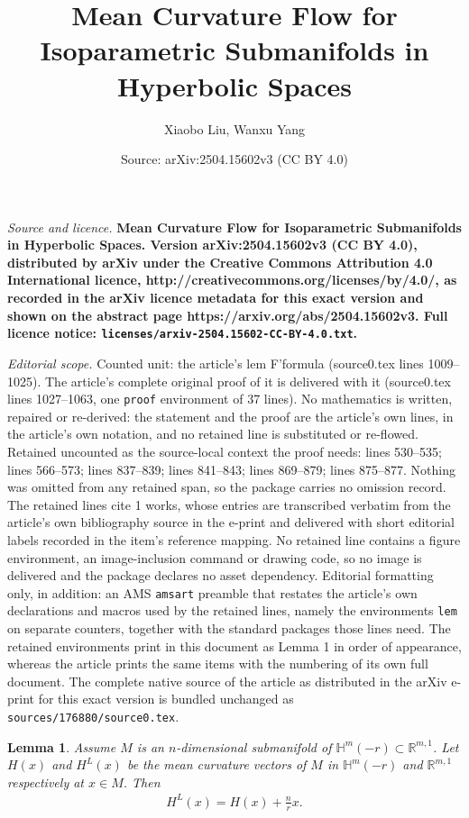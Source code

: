 \documentclass[10pt,a4paper]{amsart}
\title{\bf Mean Curvature Flow for Isoparametric Submanifolds in Hyperbolic Spaces}
\author{Xiaobo Liu, Wanxu Yang}
\date{Source: arXiv:2504.15602v3 (CC BY 4.0)}
\newtheorem{lem}{Lemma}
\begin{document}
\maketitle

\noindent\emph{Source and licence.} \bf Mean Curvature Flow for Isoparametric Submanifolds in Hyperbolic Spaces. Version arXiv:2504.15602v3 (CC BY 4.0), distributed by arXiv under the Creative Commons Attribution 4.0 International licence, http://creativecommons.org/licenses/by/4.0/, as recorded in the arXiv licence metadata for this exact version and shown on the abstract page https://arxiv.org/abs/2504.15602v3. Full licence notice: \texttt{licenses/arxiv-2504.15602-CC-BY-4.0.txt}.\par\smallskip

\noindent\textit{Editorial scope.} Counted unit: the article's lem F'formula (source0.tex lines 1009--1025). The article's complete original proof of it is delivered with it (source0.tex lines 1027--1063, one \texttt{proof} environment of 37 lines). No mathematics is written, repaired or re-derived: the statement and the proof are the article's own lines, in the article's own notation, and no retained line is substituted or re-flowed.  Retained uncounted as the source-local context the proof needs: lines 530--535; lines 566--573; lines 837--839; lines 841--843; lines 869--879; lines 875--877.  Nothing was omitted from any retained span, so the package carries no omission record.  The retained lines cite 1 works, whose entries are transcribed verbatim from the article's own bibliography source in the e-print and delivered with short editorial labels recorded in the item's reference mapping.  No retained line contains a figure environment, an image-inclusion command or drawing code, so no image is delivered and the package declares no asset dependency.  Editorial formatting only, in addition: an AMS \texttt{amsart} preamble that restates the article's own declarations and macros used by the retained lines, namely the environments \texttt{lem} on separate counters, together with the standard packages those lines need.  The retained environments print in this document as Lemma 1 in order of appearance, whereas the article prints the same items with the numbering of its own full document.  The complete native source of the article as distributed in the arXiv e-print for this exact version is bundled unchanged as \texttt{sources/176880/source0.tex}.
\begin{lem} \label{4.1}
		Assume $M$ is an $n$-dimensional submanifold of $\mathbb{H}^{m}(-r) \subset \mathbb R^{m,1}$. Let $H(x)$ and  $H^L(x)$  be the mean curvature vectors of $M$ in $\mathbb{H}^{m}(-r)$ and  $\mathbb R^{m,1}$ respectively at $x \in M$. Then
	\begin{align*}
		H^L(x) = H(x) + \frac{n}{r}x.
	\end{align*}
\end{lem}
\end{document}
